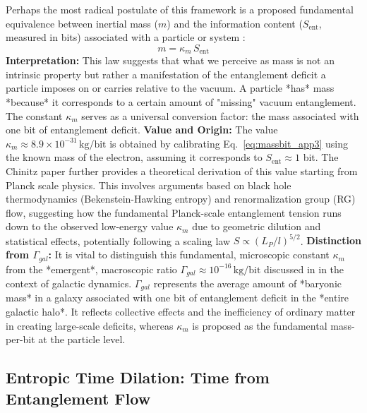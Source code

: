 \documentclass[11pt]{article}
\begin{document}
Perhaps the most radical postulate of this framework is a proposed fundamental equivalence between inertial mass ($m$) and the information content ($S_{\mathrm{ent}}$, measured in bits) associated with a particle or system \cite{Chinitz2025}:
\begin{equation}
\boxed{m = \kappa_m\,S_{\mathrm{ent}}} \label{eq:massbit_app3}
\end{equation}
\textbf{Interpretation:} This law suggests that what we perceive as mass is not an intrinsic property but rather a manifestation of the entanglement deficit a particle imposes on or carries relative to the vacuum. A particle *has* mass *because* it corresponds to a certain amount of "missing" vacuum entanglement. The constant $\kappa_m$ serves as a universal conversion factor: the mass associated with one bit of entanglement deficit.
\textbf{Value and Origin:} The value $\kappa_m \approx 8.9 \times 10^{-31}\,\text{kg/bit}$ is obtained by calibrating Eq.~\eqref{eq:massbit_app3} using the known mass of the electron, assuming it corresponds to $S_{\mathrm{ent}} \approx 1$ bit. The Chinitz paper \cite[Appendix X]{Chinitz2025} further provides a theoretical derivation of this value starting from Planck scale physics. This involves arguments based on black hole thermodynamics (Bekenstein-Hawking entropy) and renormalization group (RG) flow, suggesting how the fundamental Planck-scale entanglement tension runs down to the observed low-energy value $\kappa_m$ due to geometric dilution and statistical effects, potentially following a scaling law $S \propto (L_P/l)^{5/2}$.
\textbf{Distinction from $\Gamma_{gal}$:} It is vital to distinguish this fundamental, microscopic constant $\kappa_m$ from the *emergent*, macroscopic ratio $\Gamma_{gal} \approx 10^{-16}\,\text{kg/bit}$ discussed in \cite{Chinitz2025} in the context of galactic dynamics. $\Gamma_{gal}$ represents the average amount of *baryonic mass* in a galaxy associated with one bit of entanglement deficit in the *entire galactic halo*. It reflects collective effects and the inefficiency of ordinary matter in creating large-scale deficits, whereas $\kappa_m$ is proposed as the fundamental mass-per-bit at the particle level.

\subsection{Entropic Time Dilation: Time from Entanglement Flow}
\end{document}

